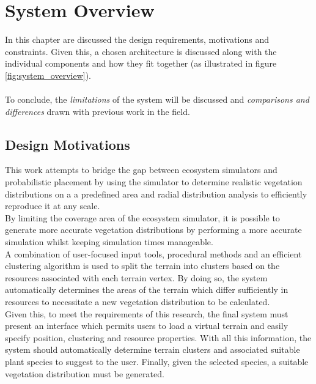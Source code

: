 \chapter{System Overview} \label{chap:system_overview}

In this chapter are discussed the design requirements, motivations and constraints. Given this, a chosen architecture is discussed along with the individual components and how they fit together (as illustrated in figure \ref{fig:system_overview}).\\\\
To conclude, the \textit{limitations} of the system will be discussed and \textit{comparisons and differences} drawn with previous work in the field.

\section{Design Motivations} \label{sec:design_constraints}

This work attempts to bridge the gap between ecosystem simulators and probabilistic placement by using the simulator to determine realistic vegetation distributions on a a predefined area and radial distribution analysis to efficiently reproduce it at any scale.\\
By limiting the coverage area of the ecosystem simulator, it is possible to generate more accurate vegetation distributions by performing a more accurate simulation whilst keeping simulation times manageable.\\
A combination of user-focused input tools, procedural methods and an efficient clustering algorithm is used to split the terrain into clusters based on the resources associated with each terrain vertex. By doing so, the system automatically determines the areas of the terrain which differ sufficiently in resources to necessitate a new vegetation distribution to be calculated.\\

Given this, to meet the requirements of this research, the final system must present an interface which permits users to load a virtual terrain and easily specify position, clustering and resource properties. With all this information, the system should automatically determine terrain clusters and associated suitable plant species to suggest to the user. Finally, given the selected species, a suitable vegetation distribution must be generated.\\

